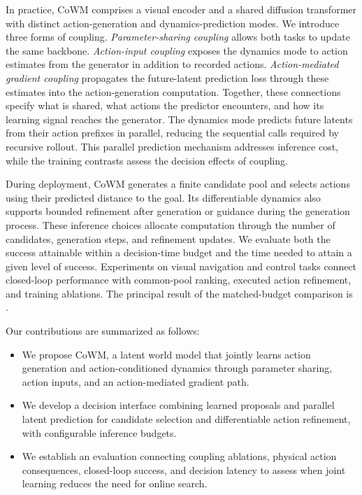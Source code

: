 In practice, CoWM comprises a visual encoder and a shared diffusion transformer with distinct action-generation and dynamics-prediction modes. We introduce three forms of coupling. \emph{Parameter-sharing coupling} allows both tasks to update the same backbone. \emph{Action-input coupling} exposes the dynamics mode to action estimates from the generator in addition to recorded actions. \emph{Action-mediated gradient coupling} propagates the future-latent prediction loss through these estimates into the action-generation computation. Together, these connections specify what is shared, what actions the predictor encounters, and how its learning signal reaches the generator. The dynamics mode predicts future latents from their action prefixes in parallel, reducing the sequential calls required by recursive rollout. This parallel prediction mechanism addresses inference cost, while the training contrasts assess the decision effects of coupling.

During deployment, CoWM generates a finite candidate pool and selects actions using their predicted distance to the goal. Its differentiable dynamics also supports bounded refinement after generation or guidance during the generation process. These inference choices allocate computation through the number of candidates, generation steps, and refinement updates. We evaluate both the success attainable within a decision-time budget and the time needed to attain a given level of success. Experiments on visual navigation and control tasks connect closed-loop performance with common-pool ranking, executed action refinement, and training ablations. The principal result of the matched-budget comparison is .

Our contributions are summarized as follows:
\begin{itemize}
\item We propose CoWM, a latent world model that jointly learns action generation and action-conditioned dynamics through parameter sharing, action inputs, and an action-mediated gradient path.
\item We develop a decision interface combining learned proposals and parallel latent prediction for candidate selection and differentiable action refinement, with configurable inference budgets.
\item We establish an evaluation connecting coupling ablations, physical action consequences, closed-loop success, and decision latency to assess when joint learning reduces the need for online search.
\end{itemize}
